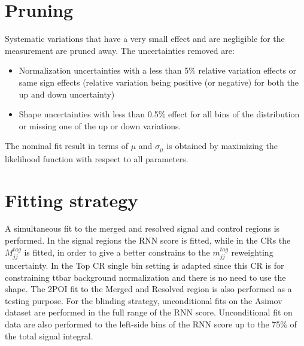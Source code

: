 \section{Pruning}
Systematic variations that have a very small effect and are negligible for the measurement are pruned away. The uncertainties removed are:
  \begin{itemize}
   \item  Normalization uncertainties with a less than 5$\%$ relative variation effects or same sign effects (relative variation being positive (or negative) for both the up and down uncertainty)
   \item  Shape uncertainties with less than 0.5$\%$ effect for all bins of the distribution or missing one of the up or down variations.
    \end{itemize}
    
The nominal fit result in terms of $\mu$ and $\sigma_{\mu}$ is obtained by maximizing the likelihood function with respect to all parameters.

\section{Fitting strategy}
A simultaneous fit to the merged and resolved signal and control regions is performed. In the signal regions the RNN score is fitted, while in the CRs the $M^{tag}_{jj}$ is fitted, in order to give a better constrains to the $m^{tag}_{jj}$ reweighting uncertainty. In the Top CR single bin setting is adapted since this CR is for constraining ttbar background normalization and there is no need to use the shape. 
The 2POI fit to the Merged and Resolved region is also performed as a testing purpose. For the blinding strategy, unconditional fits on the Asimov dataset are performed in the full range of the RNN score. Unconditional fit on data are also performed to the left-side bins of the RNN score up to the 75\% of the total signal integral.
